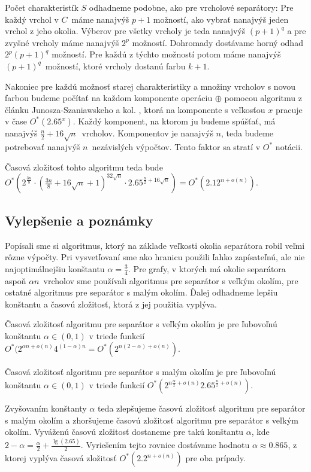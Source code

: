 Počet charakteristík $S$ odhadneme podobne, ako pre vrcholové separátory: Pre každý vrchol v $C$ máme
nanajvýš $p+1$ možností, ako vybrať nanajvýš jeden vrchol z jeho okolia. Výberov pre všetky vrcholy je
teda nanajvýš $(p+1)^q$ a pre zvyšné vrcholy máme nanajvýš $2^p$ možností. Dohromady dostávame horný
odhad $2^p (p+1)^q$ možností. Pre každú z týchto možností potom máme nanajvýš $(p+1)^q$ možností, ktoré
vrcholy dostanú farbu $k+1$.

Nakoniec pre každú možnosť starej charakteristiky a množiny vrcholov s novou farbou budeme počítať
na každom komponente operáciu $\oplus$ pomocou algoritmu z článku Junosza-Szaniawskeho a kol. \cite{junosza_fast},
ktorá na komponente s veľkosťou $x$ pracuje v čase $O^*(2.65^x)$. Každý komponent, na ktorom ju budeme
spúšťať, má nanajvýš $\frac{n}{2} + 16\sqrt{n}$ vrcholov. Komponentov je nanajvýš $n$, teda budeme
potrebovať nanajvýš $n$ nezávislých výpočtov. Tento faktor sa stratí v $O^*$ notácii.

Časová zložitosť tohto algoritmu teda bude $O^*\left(2^{\frac{3n}{8}} \cdot (\frac{3n}{8} + 16 \sqrt{n} + 1)^{32 \sqrt{n}} \cdot 2.65^{\frac{n}{2} + 16 \sqrt{n}}\right) = O^*\left(2.12^{n + o(n)}\right)$.

\subsection{Vylepšenie a poznámky}

Popísali sme si algoritmus, ktorý na základe veľkosti okolia separátora robil veľmi rôzne výpočty.
Pri vysvetľovaní sme ako hranicu použili ľahko zapísateľnú, ale nie najoptimálnejšiu konštantu
$\alpha = \frac{3}{4}$. Pre grafy, v ktorých má okolie separátora aspoň $\alpha n$ vrcholov
sme používali algoritmus pre separátor s veľkým okolím, pre ostatné algoritmus pre separátor
s malým okolím. Ďalej odhadneme lepšiu konštantu a časovú zložitosť, ktorá z jej použitia vyplýva.

Časová zložitosť algoritmu pre separátor s veľkým okolím je pre ľubovoľnú konštantu $\alpha \in (0, 1)$
v triede funkcií $O^*(2^{\alpha n + o(n)}4^{(1 - \alpha) n} = O^*(2^{n(2 - \alpha) + o(n)})$.

Časová zložitosť algoritmu pre separátor s malým okolím je pre ľubovoľnú konštantu $\alpha \in (0,1)$
v triede funkcií $O^*(2^{n\frac{\alpha}{2} + o(n)} 2.65^{\frac{n}{2} + o(n)})$.

Zvyšovaním konštanty $\alpha$ teda zlepšujeme časovú zložitosť algoritmu pre separátor s malým
okolím a zhoršujeme časovú zložitosť algoritmu pre separátor s veľkým okolím. Vyváženú časovú
zložitosť dostaneme pre takú konštantu $\alpha$, kde $2 - \alpha = \frac{\alpha}{2} + \frac{\lg(2.65)}{2}$.
Vyriešením tejto rovnice dostávame hodnotu $\alpha \approx 0.865$, z ktorej vyplýva časová zložitosť
$O^*(2.2^{n + o(n)})$ pre oba prípady.

